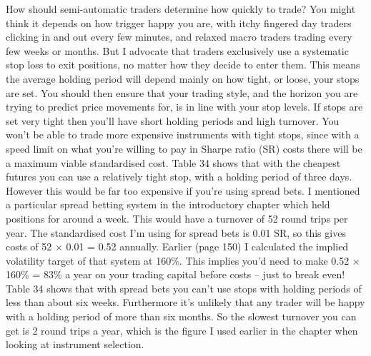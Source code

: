 \begin{englishblock} How should semi-automatic traders determine how quickly to trade? You might think it depends on how trigger happy you are, with itchy fingered day traders clicking in and out every few minutes, and relaxed macro traders trading every few weeks or months. But I advocate that traders exclusively use a systematic stop loss to exit positions, no matter how they decide to enter them. This means the average holding period will depend mainly on how tight, or loose, your stops are set. You should then ensure that your trading style, and the horizon you are trying to predict price movements for, is in line with your stop levels. If stops are set very tight then you'll have short holding periods and high turnover. You won't be able to trade more expensive instruments with tight stops, since with a speed limit on what you're willing to pay in Sharpe ratio (SR) costs there will be a maximum viable standardised cost. Table 34 shows that with the cheapest futures you can use a relatively tight stop, with a holding period of three days. However this would be far too expensive if you're using spread bets. I mentioned a particular spread betting system in the introductory chapter which held positions for around a week. This would have a turnover of 52 round trips per year. The standardised cost I'm using for spread bets is 0.01 SR, so this gives costs of 52 × 0.01 = 0.52 annually. Earlier (page 150) I calculated the implied volatility target of that system at 160\%. This implies you'd need to make 0.52 × 160\% = 83\% a year on your trading capital before costs -- just to break even! Table 34 shows that with spread bets you can't use stops with holding periods of less than about six weeks. Furthermore it's unlikely that any trader will be happy with a holding period of more than six months. So the slowest turnover you can get is 2 round trips a year, which is the figure I used earlier in the chapter when looking at instrument selection. \end{englishblock}

